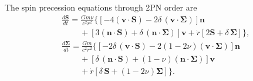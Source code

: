 \documentclass[aps, prd,
twocolumn,%
superscriptaddress,
showpacs, nofootinbib, eqsecnum, amsmath, amssymb, floatfix
]{revtex4}
\begin{document}
The spin precession equations through 2PN order are~\cite{Kidder:1995zr,
  Racine:2008qv}
\begin{subequations}
\begin{align}
&\frac{d\bm{S}}{dt}=\frac{G m \nu}{c^2 r^2}\bigg\{
\left[-4 (\bm{v}\cdot \bm{S})-
2 \delta\,(\bm{v}\cdot \bm{\Sigma})\right]\bm{n} \nonumber\\
& \qquad~ +\left[3 (\bm{n}\cdot \bm{S})+
\delta\,(\bm{n}\cdot \bm{\Sigma})\right]\bm{v}+\dot r \left[2 \bm{S}+
\delta\,\bm{\Sigma}\right]\bigg\},\\
&\frac{d\bm{\Sigma}}{dt}= \frac{G m}{c^2 r^2}\bigg\{
\left[-2 \delta\,(\bm{v}\cdot \bm{S})-
2(1-2\nu)(\bm{v}\cdot \bm{\Sigma})\right]\bm{n}\nonumber\\
& \qquad~ +\left[\delta\, (\bm{n}\cdot \bm{S})+
(1-\nu)(\bm{n}\cdot \bm{\Sigma})\right]\bm{v}\nonumber\\
& \qquad~ +  \dot r \left[\delta\,\bm{S}+
(1-2\nu)\bm{\Sigma}\right]\bigg\}.
\end{align}
\end{subequations}
\end{document}
